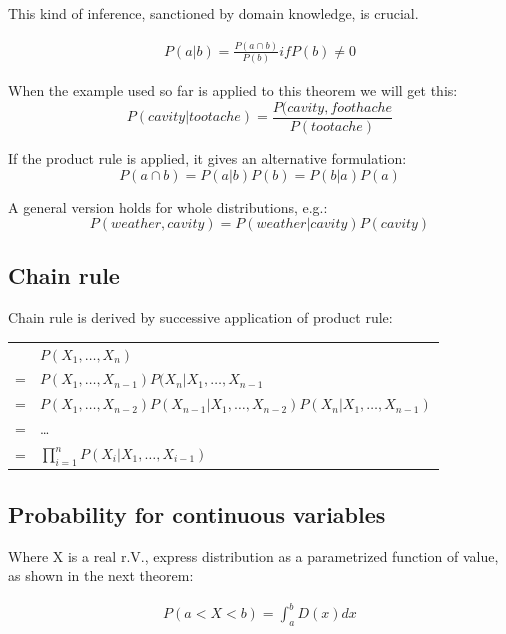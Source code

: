 This kind of inference, sanctioned by domain knowledge, is crucial.

\begin{theorem}
\begin{align}
P(a|b) = \frac{P(a \cap b)}{P(b)} if P(b) \neq 0
\end{align}
\end{theorem}

When the example used so far is applied to this theorem we will get this:\\
\begin{equation}
P(cavity|tootache) = \frac{P(cavity, foothache}{P(tootache)}
\end{equation}

If the product rule is applied, it gives an alternative formulation:\\
\begin{equation}
P(a \cap b) = P(a|b)P(b) = P(b|a)P(a)
\end{equation}

A general version holds for whole distributions, e.g.:\\
\begin{equation}
P(weather, cavity) = P(weather|cavity)P(cavity)
\end{equation}

\subsection{Chain rule}
Chain rule is derived by successive application of product rule:

\begin{table}
\centering
\begin{tabular}{l l}
 & $P(X_1, \dots , X_n)$\\
= & $P(X_1, \dots , X_{n-1})P(X_n | X_1, \dots , X_{n-1}$\\
= & $P(X_1, \dots , X_{n-2})P(X_{n-1}|X_1, \dots, X_{n-2})P(X_n|X_1, \dots , X_{n-1})$\\
= & \dots \\
= & $\prod_{i = 1}^n P(X_i|X_1, \dots , X_{i-1})$ 
\end{tabular}
\end{table}

\subsection{Probability for continuous variables}
Where X is a real r.V., express distribution as a parametrized function of value, as shown in the next theorem:\\
\begin{theorem}
\begin{align}
P(a < X < b) = \int_a^b D(x)dx
\end{align}
\end{theorem}

